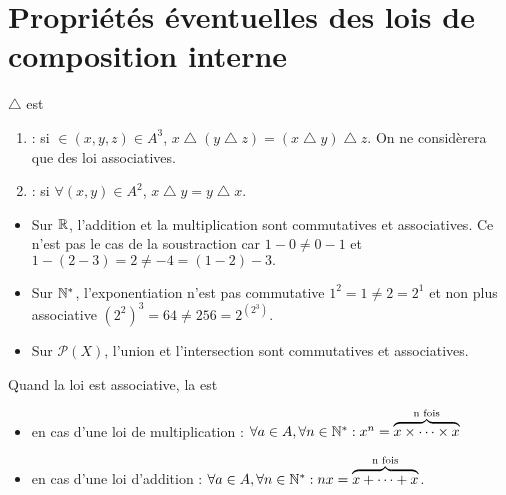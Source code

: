 \documentclass{book}
\begin{document}
\section{Propriétés éventuelles des lois de composition interne}
\begin{Definition}
$\bigtriangleup$ est
\begin{enumerate}
\item  {} : si $\in(x,y,z)\in A^3$, $x \bigtriangleup (y \bigtriangleup z) = (x \bigtriangleup y) \bigtriangleup z$.
  On ne considèrera que des loi associatives.
\item
  : si $\forall(x,y)\in A^2$, $x \bigtriangleup y = y \bigtriangleup x$.
 \end{enumerate}
\end{Definition} 
 \begin{Exemple}
\begin{itemize}
\item Sur $\mathbb{R}$, l'addition et la multiplication sont commutatives et associatives. Ce n'est pas le cas de la soustraction car $1-0\neq 0-1$ et $1-(2-3)=2\neq -4= (1-2)-3.$
\item Sur $\mathbb{N}^*$,  l'exponentiation n'est pas commutative $1^2=1\neq 2=2^1$ et non plus associative $\left(2^2\right)^3 = 64\neq 256 =2^{(2^3)}$.
\item Sur  $\mathcal{P}(X)$, l'union et l'intersection sont commutatives et associatives.
\end{itemize}
\end{Exemple}
\begin{Remarque}
Quand la loi est associative, la  est
\begin{itemize}
\item en cas d'une loi de multiplication : $\forall a\in A,\forall n\in\mathbb{N}^*: x^n=\overbrace{x\times \dots \times x }^{\text{n fois}} $
\item en cas d'une loi d'addition : $\forall a\in A,\forall n\in\mathbb{N}^*: nx=\overbrace{x+ \dots + x }^{\text{n fois}} $.
\end{itemize}  
\end{Remarque}
\end{document}
